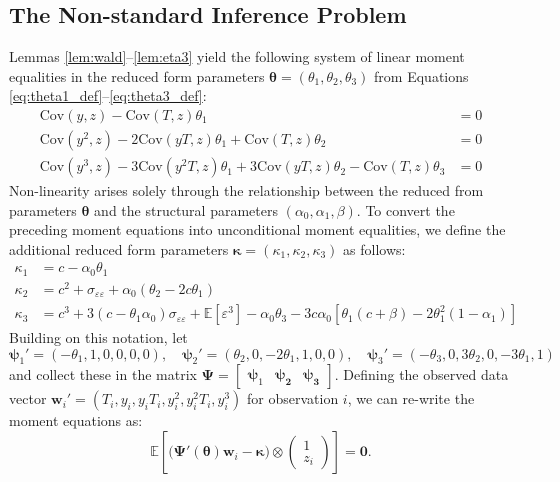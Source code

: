 \subsection{The Non-standard Inference Problem}
\label{sec:problem}
Lemmas \ref{lem:wald}--\ref{lem:eta3} yield the following system of linear moment equalities in the reduced form parameters $\boldsymbol{\theta} = (\theta_1, \theta_2, \theta_3)$ from Equations \ref{eq:theta1_def}--\ref{eq:theta3_def}:
\begin{align*}
  \mbox{Cov}(y,z) - \mbox{Cov}(T,z) \theta_1 &= 0\\
  \mbox{Cov}(y^2,z) - 2\mbox{Cov}(yT,z) \theta_1 + \mbox{Cov}(T,z)\theta_2 &= 0\\
  \mbox{Cov}(y^3,z) - 3 \mbox{Cov}(y^2T,z) \theta_1 + 3\mbox{Cov}(yT,z) \theta_2 - \mbox{Cov}(T,z) \theta_3 &= 0
\end{align*}
Non-linearity arises solely through the relationship between the reduced from parameters $\boldsymbol{\theta}$ and the structural parameters $(\alpha_0, \alpha_1, \beta)$.
To convert the preceding moment equations into unconditional moment equalities, we define the additional reduced form parameters $\boldsymbol{\kappa} = (\kappa_1, \kappa_2, \kappa_3)$ as follows:
\begin{align*}
\kappa_1 &= c - \alpha_0 \theta_1\\
  \kappa_2 &= c^2 + \sigma_{\varepsilon\varepsilon} + \alpha_0 (\theta_2 - 2c \theta_1)\\
  \kappa_3 &= c^3 + 3\left( c - \theta_1 \alpha_0 \right) \sigma_{\varepsilon\varepsilon} + \mathbb{E}[\varepsilon^3] - \alpha_0 \theta_3 - 3 c \alpha_0 \left[ \theta_1 \left( c + \beta \right) - 2\theta_1^2 (1 - \alpha_1) \right]
\end{align*}
Building on this notation, let
\begin{equation}
  \boldsymbol{\psi}_1' = (-\theta_1, 1, 0, 0, 0, 0), \quad
  \boldsymbol{\psi}_2' = (\theta_2, 0, -2\theta_1, 1, 0, 0), \quad
  \boldsymbol{\psi}_3' = (-\theta_3, 0, 3\theta_2, 0, -3\theta_1, 1)
  \label{eq:psi_def}
\end{equation}
and collect these in the matrix
$\boldsymbol{\Psi} = \left[
  \begin{array}{ccc}
    \boldsymbol{\psi}_1 & \boldsymbol{\psi_2} & \boldsymbol{\psi_3}
\end{array}\right]$.
Defining the observed data vector $\mathbf{w}_i' = (T_i, y_i, y_iT_i, y_i^2, y_i^2 T_i, y_i^3)$ for observation $i$, we can re-write the moment equations as:
\begin{equation}
\mathbb{E}\left[
  \big(\boldsymbol{\Psi}'(\boldsymbol{\theta})\mathbf{w}_i - \boldsymbol{\kappa}\big) \otimes 
\left(
\begin{array}{c}
  1 \\ z_i
\end{array}\right)
\right] = \mathbf{0}.
\label{eq:MCs_endog}
\end{equation}

